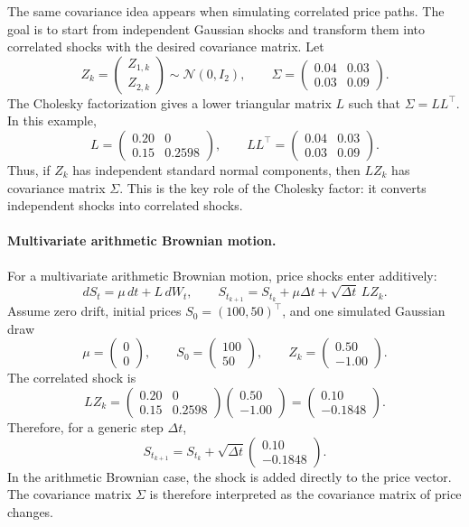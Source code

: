 \documentclass[a4paper,10pt,titlepage,oneside,openany]{book}
\theoremstyle{plain}\newtheorem{theorem}{Theorem}[chapter]
\theoremstyle{definition}\newtheorem{definition}{Definition}[chapter]
\theoremstyle{remark}\newtheorem{remark}{Remark}[chapter]
\begin{document}
The same covariance idea appears when simulating correlated price paths. The goal is to start from independent Gaussian shocks and transform them into correlated shocks with the desired covariance matrix. Let
\[
Z_k=
\begin{pmatrix}
Z_{1,k}\\
Z_{2,k}
\end{pmatrix}
\sim
\mathcal{N}(0,I_2),
\qquad
\Sigma=
\begin{pmatrix}
0.04 & 0.03\\
0.03 & 0.09
\end{pmatrix}.
\]
The Cholesky factorization gives a lower triangular matrix $L$ such that $\Sigma=LL^\top$. In this example,
\[
L=
\begin{pmatrix}
0.20 & 0\\
0.15 & 0.2598
\end{pmatrix},
\qquad
LL^\top=
\begin{pmatrix}
0.04 & 0.03\\
0.03 & 0.09
\end{pmatrix}.
\]
Thus, if $Z_k$ has independent standard normal components, then $LZ_k$ has covariance matrix $\Sigma$. This is the key role of the Cholesky factor: it converts independent shocks into correlated shocks.

\paragraph{Multivariate arithmetic Brownian motion.}
For a multivariate arithmetic Brownian motion, price shocks enter additively:
\[
dS_t=\mu\,dt+L\,dW_t,
\qquad
S_{t_{k+1}}=S_{t_k}+\mu\Delta t+\sqrt{\Delta t}\,LZ_k.
\]
Assume zero drift, initial prices $S_0=(100,50)^\top$, and one simulated Gaussian draw
\[
\mu=
\begin{pmatrix}
0\\
0
\end{pmatrix},
\qquad
S_0=
\begin{pmatrix}
100\\
50
\end{pmatrix},
\qquad
Z_k=
\begin{pmatrix}
0.50\\
-1.00
\end{pmatrix}.
\]
The correlated shock is
\[
LZ_k
=
\begin{pmatrix}
0.20 & 0\\
0.15 & 0.2598
\end{pmatrix}
\begin{pmatrix}
0.50\\
-1.00
\end{pmatrix}
=
\begin{pmatrix}
0.10\\
-0.1848
\end{pmatrix}.
\]
Therefore, for a generic step $\Delta t$,
\[
S_{t_{k+1}}
=
S_{t_k}
+
\sqrt{\Delta t}
\begin{pmatrix}
0.10\\
-0.1848
\end{pmatrix}.
\]
In the arithmetic Brownian case, the shock is added directly to the price vector. The covariance matrix $\Sigma$ is therefore interpreted as the covariance matrix of price changes.
\end{document}
